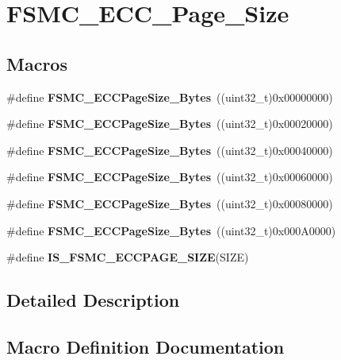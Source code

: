 \section{F\+S\+M\+C\+\_\+\+E\+C\+C\+\_\+\+Page\+\_\+\+Size}
\label{group__FSMC__ECC__Page__Size}
\subsection*{Macros}
\begin{DoxyCompactItemize}
\item 
\#define \textbf{ F\+S\+M\+C\+\_\+\+E\+C\+C\+Page\+Size\+\_\+Bytes}~((uint32\+\_\+t)0x00000000)
\item 
\#define \textbf{ F\+S\+M\+C\+\_\+\+E\+C\+C\+Page\+Size\+\_\+Bytes}~((uint32\+\_\+t)0x00020000)
\item 
\#define \textbf{ F\+S\+M\+C\+\_\+\+E\+C\+C\+Page\+Size\+\_\+Bytes}~((uint32\+\_\+t)0x00040000)
\item 
\#define \textbf{ F\+S\+M\+C\+\_\+\+E\+C\+C\+Page\+Size\+\_\+Bytes}~((uint32\+\_\+t)0x00060000)
\item 
\#define \textbf{ F\+S\+M\+C\+\_\+\+E\+C\+C\+Page\+Size\+\_\+Bytes}~((uint32\+\_\+t)0x00080000)
\item 
\#define \textbf{ F\+S\+M\+C\+\_\+\+E\+C\+C\+Page\+Size\+\_\+Bytes}~((uint32\+\_\+t)0x000\+A0000)
\item 
\#define \textbf{ I\+S\+\_\+\+F\+S\+M\+C\+\_\+\+E\+C\+C\+P\+A\+G\+E\+\_\+\+S\+I\+ZE}(S\+I\+ZE)
\end{DoxyCompactItemize}


\subsection{Detailed Description}


\subsection{Macro Definition Documentation}
\mbox{\label{group__FSMC__ECC__Page__Size_ga8137931c96b63ec7e6f80a8c7391433f}} 

